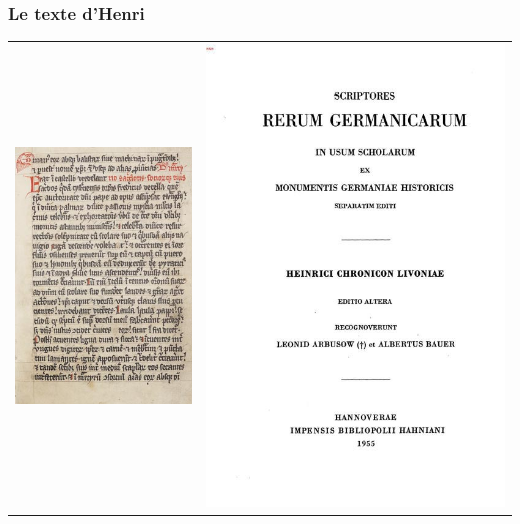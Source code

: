 \documentclass[11pt]{beamer}
\newenvironment{slide}[1]{%
\begin{frame}[environment=slide]
\frametitle{#1}
}{%
\end{frame}
}
\begin{document}
\begin{slide}{Le texte d'Henri}
\begin{center}
\begin{tabular}{cc}
\includegraphics[scale=0.4]{HL.jpg} &
\includegraphics[scale=0.3]{MGH.jpeg}
\end{tabular}
\end{center}
\end{slide}
\end{document}
